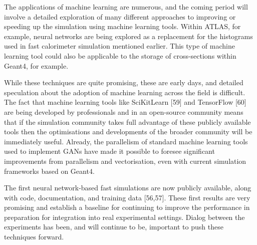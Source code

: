 \documentclass[12pt,a4paper]{article}
\begin{document}
The applications of machine learning are numerous, and the coming period
will involve a detailed exploration of many different approaches to
improving or speeding up the simulation using machine learning tools.
Within ATLAS, for example, neural networks are being explored as a
replacement for the histograms used in fast calorimeter simulation
mentioned earlier. This type of machine learning tool could also be
applicable to the storage of cross-sections within Geant4, for example.

While these techniques are quite promising, these are early days, and
detailed speculation about the adoption of machine learning across the
field is difficult. The fact that machine learning tools like
SciKitLearn {[}59{]} and TensorFlow {[}60{]} are being developed by
professionals and in an open-source community means that if the
simulation community takes full advantage of these publicly available
tools then the optimisations and developments of the broader community
will be immediately useful. Already, the parallelism of standard machine
learning tools used to implement GANs have made it possible to foresee
significant improvements from parallelism and vectorisation, even with
current simulation frameworks based on Geant4.

The first neural network-based fast simulations are now publicly
available, along with code, documentation, and training data
{[}56,57{]}. These first results are very promising and establish a
baseline for continuing to improve the performance in preparation for
integration into real experimental settings. Dialog between the
experiments has been, and will continue to be, important to push these
techniques forward.
\end{document}
